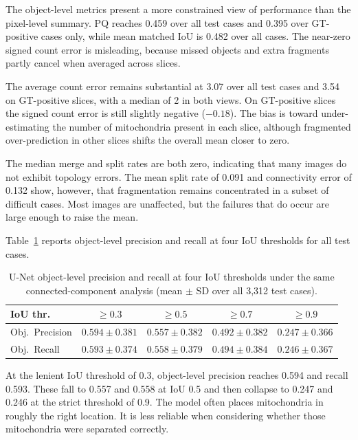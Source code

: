 \documentclass[logo,bsc,singlespacing,parskip,online]{infthesis}
\begin{document}
The object-level metrics present a more constrained view of performance than the
pixel-level summary. PQ reaches 0.459 over all test cases and 0.395 over
GT-positive cases only, while mean matched IoU is 0.482 over all cases. The 
near-zero signed count error is misleading, because missed objects and extra 
fragments partly cancel when averaged across slices.

The average count error remains substantial at 3.07 over all test cases and 3.54
on GT-positive slices, with a median of 2 in both views. On GT-positive slices
the signed count error is still slightly negative ($-0.18$). The bias
is toward under-estimating the number of mitochondria present in each slice, although
fragmented over-prediction in other slices shifts the
overall mean closer to zero.

The median merge and split rates are both zero, indicating that many images do
not exhibit topology errors. The mean split rate of 0.091 and connectivity
error of 0.132 show, however, that fragmentation remains concentrated in a
subset of difficult cases. Most images are unaffected, but the failures that do
occur are large enough to raise the mean.

Table~\ref{tab:unet-obj-pr} reports object-level precision and recall at four
IoU thresholds for all test cases.

\begin{table}[H]
\centering
\normalsize
\renewcommand{\arraystretch}{1.08}
\caption{U-Net object-level precision and recall at four IoU thresholds under
  the same connected-component analysis (mean $\pm$ SD over all
  3,312 test cases).}
\label{tab:unet-obj-pr}
\begin{tabular}{lcccc}
\toprule
\textbf{IoU thr.} & $\geq 0.3$ & $\geq 0.5$ & $\geq 0.7$ & $\geq 0.9$ \\
\midrule
Obj.\ Precision & $0.594 \pm 0.381$ & $0.557 \pm 0.382$ & $0.492 \pm 0.382$ & $0.247 \pm 0.366$ \\
Obj.\ Recall    & $0.593 \pm 0.374$ & $0.558 \pm 0.379$ & $0.494 \pm 0.384$ & $0.246 \pm 0.367$ \\
\bottomrule
\end{tabular}
\end{table}

At the lenient IoU threshold of 0.3, object-level precision reaches 0.594 and
recall 0.593. These fall to 0.557 and 0.558 at IoU 0.5 and then collapse to
0.247 and 0.246 at the strict threshold of 0.9. The model often places
mitochondria in roughly the right location. It is less reliable when considering
whether those mitochondria were separated correctly.
\end{document}
